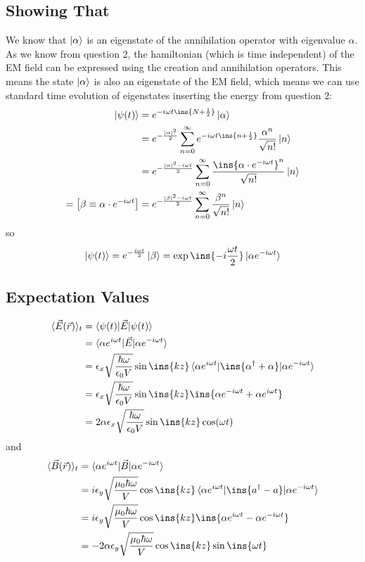 \subsection{Showing That}
We know that $\ket{\alpha}$ is an eigenstate of the annihilation operator with eigenvalue $\alpha$. As we know from question 2, the hamiltonian (which is time independent) of the EM field can be expressed using the creation and annihilation operators. This means the state $\ket{\alpha}$ is also an eigenstate of the EM field, which means we can use standard time evolution of eigenstates inserting the energy from question 2:
\begin{align}
	\ket{\psi(t)}&=e^{-i\omega t\ins{N+\frac{1}{2}}}\ket{\alpha}\\
	&= e^{-\frac{\lvert\alpha\rvert^2}{2}}\sum\limits_{n=0}^\infty e^{-i\omega t\ins{n+\frac{1}{2}}} \frac{\alpha^n}{\sqrt{n!}}\ket{n}\\
	&= e^{-\frac{\lvert\alpha\rvert^2-i\omega t}{2}}\sum\limits_{n=0}^\infty  \frac{\ins{\alpha\cdot e^{-i\omega t}}^n}{\sqrt{n!}}\ket{n}\\
	=\left[\beta\equiv\alpha\cdot e^{-i\omega t}\right] &= e^{-\frac{\lvert\beta\rvert^2-i\omega t}{2}}\sum\limits_{n=0}^\infty  \frac{\beta^n}{\sqrt{n!}}\ket{n}
\end{align}
so
\begin{equation}
	\ket{\psi(t)} = e^{-\frac{i\omega t}{2}}\ket{\beta}=\exp\ins{-i\frac{\omega t}{2}}\ket{\alpha e^{-i\omega t}}
\end{equation}
\subsection{Expectation Values}
\begin{align}
	\langle \vec E(\vec r)\rangle_t &= \braket{\psi(t)\vert \vec E \vert \psi(t)}\\
	&= \braket{\alpha e^{i\omega t}\vert\vec E \vert\alpha e^{-i\omega t}}\\
	&= \epsilon_x\sqrt{\frac{\hbar\omega}{\epsilon_0V}}\sin\ins{kz}\braket{\alpha e^{i\omega t}\vert \ins{\alpha^\dagger + \alpha} \vert\alpha e^{-i\omega t}}\\
	&= \epsilon_x\sqrt{\frac{\hbar\omega}{\epsilon_0V}}\sin\ins{kz}\ins{\alpha e^{-i\omega t}+\alpha e^{i\omega t}}\\
	&= 2\alpha\epsilon_x\sqrt{\frac{\hbar\omega}{\epsilon_0V}}\sin\ins{kz}\cos(\omega t)
\end{align}
and
\begin{align}
	\langle \vec B(\vec r)\rangle_t &= \braket{\alpha e^{i\omega t}\vert \vec B \vert \alpha e^{-i\omega t}}\\
	&= i\epsilon_y\sqrt{\frac{\mu_0\hbar\omega}{V}}\cos\ins{kz}\braket{\alpha e^{i\omega t}\vert \ins{a^\dagger-a} \vert \alpha e^{-i\omega t}}\\
	&= i\epsilon_y\sqrt{\frac{\mu_0\hbar\omega}{V}}\cos\ins{kz}\ins{\alpha e^{i\omega t}-\alpha e^{-i\omega t}}\\
	&= -2\alpha\epsilon_y\sqrt{\frac{\mu_0\hbar\omega}{V}}\cos\ins{kz}\sin\ins{\omega t}
\end{align}
